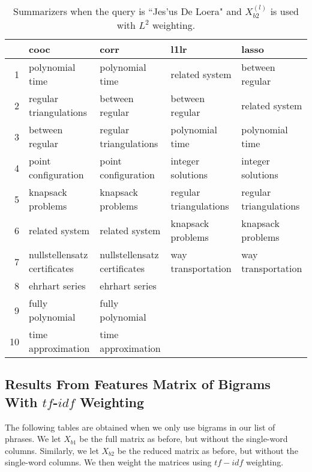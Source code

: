 \documentclass{article}
\begin{document}
\begin{table}[H]
\begin{center}
\begin{tabular}{|r|llll|}
 \hline
& cooc & corr & l1lr & lasso \\
 \hline
1 & polynomial time & polynomial time & related system & between regular \\
 2 & regular triangulations & between regular & between regular & related system \\
 3 & between regular & regular triangulations & polynomial time & polynomial time \\
 4 & point configuration & point configuration & integer solutions & integer solutions \\
 5 & knapsack problems & knapsack problems & regular triangulations & regular triangulations \\
 6 & related system & related system & knapsack problems & knapsack problems \\
 7 & nullstellensatz certificates & nullstellensatz certificates & way transportation & way transportation \\
 8 & ehrhart series & ehrhart series & & \\
 9 & fully polynomial & fully polynomial & & \\
 10 & time approximation & time approximation & & \\
 \hline
\end{tabular}
\end{center}
\caption{Summarizers when the query is ``Jes\a'us De Loera" and $X_{b2}^{(l)}$ is used with $L^2$ weighting.}
\end{table}

\subsection{Results From Features Matrix of Bigrams With $tf$-$idf$ Weighting}
The following tables are obtained when we only use bigrams in our list of phrases. We let $X_{b1}$ be the full matrix as before, but without the single-word columns. Similarly, we let $X_{b2}$ be the reduced matrix as before, but without the single-word columns. We then weight the matrices using $tf-idf$ weighting.
\end{document}
